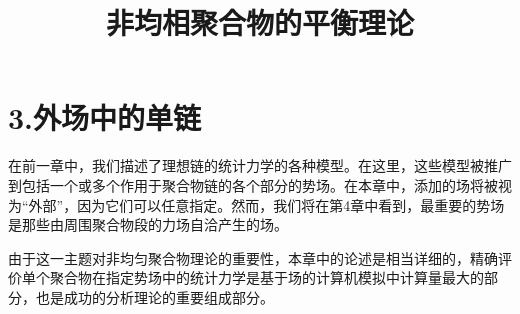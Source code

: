 \documentclass[12pt,a4paper]{article}
\title{非均相聚合物的平衡理论}
\author{}
\date{\chntoday}
\numberwithin{equation}{section}
\begin{document}
\maketitle
\section{}
\section{}
\section{3.外场中的单链}
在前一章中，我们描述了理想链的统计力学的各种模型。在这里，这些模型被推广到包括一个或多个作用于聚合物链的各个部分的势场。在本章中，添加的场将被视为“外部”，因为它们可以任意指定。然而，我们将在第4章中看到，最重要的势场是那些由周围聚合物段的力场自洽产生的场。

由于这一主题对非均匀聚合物理论的重要性，本章中的论述是相当详细的，精确评价单个聚合物在指定势场中的统计力学是基于场的计算机模拟中计算量最大的部分，也是成功的分析理论的重要组成部分。






\cite{tam19912d}

\end{document}
